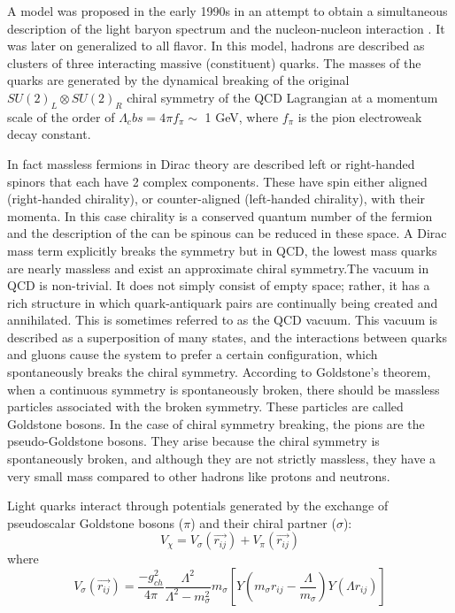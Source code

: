 \documentclass[12pt,a4paper]{book}
\begin{document}
	A model was proposed in the early 1990s in an attempt to obtain a simultaneous
	description of the light baryon spectrum and the nucleon-nucleon interaction \cite{Valcarce_2005}. It was later on generalized to all flavor. In this model, hadrons are described as clusters of three interacting massive (constituent) quarks. The masses of the quarks are generated by the dynamical breaking of the original $SU(2)_L \otimes SU(2)_R$ chiral symmetry of the QCD Lagrangian at a momentum scale of the order of $\Lambda_cbs= 4 \pi f_\pi \sim $ 1 GeV, where $f_\pi$ is the pion electroweak decay constant. 
	
	In fact massless fermions in Dirac theory are described left or right-handed spinors that each have 2 complex components. These have spin either aligned (right-handed chirality), or counter-aligned (left-handed chirality), with their momenta. In this case chirality is a conserved quantum number of the fermion and the description of the can be spinous can be reduced in these space. A Dirac mass term explicitly breaks the symmetry but in QCD, the lowest mass quarks are nearly massless and exist an approximate chiral symmetry.The vacuum in QCD is non-trivial. It does not simply consist of empty space; rather, it has a rich structure in which quark-antiquark pairs are continually being created and annihilated. This is sometimes referred to as the QCD vacuum. This vacuum is described as a superposition of many states, and the interactions between quarks and gluons cause the system to prefer a certain configuration, which spontaneously breaks the chiral symmetry.
	According to Goldstone's theorem, when a continuous symmetry is spontaneously broken, there should be massless particles associated with the broken symmetry. These particles are called Goldstone bosons. In the case of chiral symmetry breaking, the pions are the pseudo-Goldstone bosons. They arise because the chiral symmetry is spontaneously broken, and although they are not strictly massless, they have a very small mass compared to other hadrons like protons and neutrons. \cite{Smit_2023}
	
	Light quarks interact through potentials generated by the exchange of pseudoscalar Goldstone bosons ($\pi$) and their chiral partner ($\sigma$):
	\begin{equation}
		V_\chi = V_\sigma(\vec{r_{ij}}) +V_\pi (\vec{r_{ij}})
	\end{equation}
	where 
	\begin{equation}
		V_\sigma(\vec{r_{ij}})= \frac{-g_{ch}^2}{4\pi} \frac{\Lambda^2}{\Lambda^2-m_\sigma^2} m_\sigma \left[ Y(m_\sigma r_{ij}- \frac{\Lambda}{m_\sigma}) Y(\Lambda r_{ij}) \right]
		\label{eq:sigma-potential}
	\end{equation}
	
\end{document}
